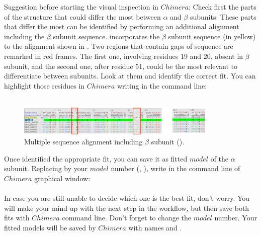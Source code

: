 \begin{itemize}
  Suggestion before starting the visual inspection in $Chimera$: Check first the parts of the structure that could differ the most between  $\alpha$ and $\beta$ subunits. These parts that differ the most can be identified by performing an additional alignment including the $\beta$ subunit sequence.  incorporates the $\beta$ subunit sequence (in yellow) to the alignment shown in . Two regions that contain gaps of sequence are remarked in red frames. The first one, involving residues 19 and 20, absent in $\beta$ subunit, and the second one, after residue 51, could be the most relevant to differentiate between subunits. Look at them and identify the correct fit. You can highlight those residues in $Chimera$ writing in the command line:\\
  \\
  
  \begin{figure}[H]
  \centering 
  \captionsetup{width=.7\linewidth} 
  \includegraphics[width=0.85\textwidth]{Images/Fig23.png}
  \caption{Multiple sequence alignment including  $\beta$ subunit ().}
  \label{fig:multiple_alignment_HBB}
  \end{figure}
  
  Once identified the appropriate fit, you can save it as fitted $model$ of the  $\alpha$ subunit. Replacing  by your $model$ number (, ), write in the command line of $Chimera$ graphical window:\\
  
  \\
  
In case you are still unable to decide which one is the best fit, don't worry. You will make your mind up with the next step in the workflow, but then save both fits with  $Chimera$ command line. Don't forget to change the $model$ number. Your fitted models will be saved by $Chimera$ with names  and .
 
\end{itemize}
